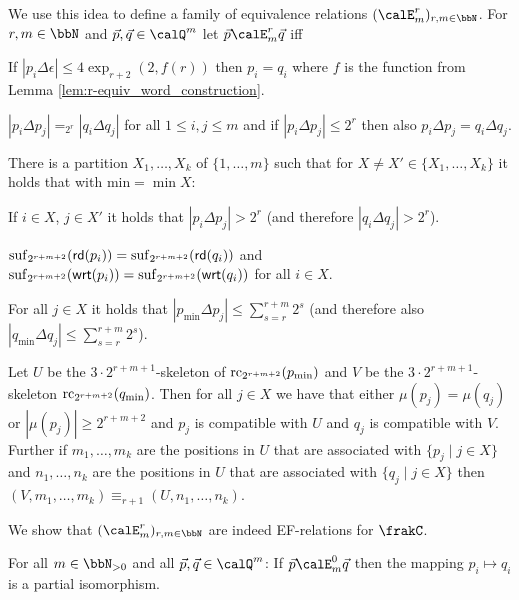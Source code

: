 We use this idea to  define a family of  equivalence relations $(\calE^r_m)_{r,m\in\bbN}$.
For $r,m\in \bbN$ and $\vec{p},\vec{q}\in \Qx^m$ let $\vec{p} \calE^r_m \vec{q}$ iff
\begin{bracketenumerate}
	\item If $|p_i \Delta \epsilon| \leq 4\exp_{r+2}(2, f(r))$ then $p_i=q_i$ where $f$ is the function from Lemma \ref{lem:r-equiv_word_construction}.
	\item\label{item:E_distance} $|p_i \Delta p_j| =_{2^r} |q_i\Delta q_j|$ for all $1\leq i, j\leq m$ and if $|p_i\Delta p_j| \leq 2^r$ then also $p_i \Delta p_j = q_i\Delta q_j$. 
	\item\label{item:E_partition} There is a partition $X_1,\ldots,X_k$ of $\{1,\ldots,m\}$ such that for $X\neq X'\in \{X_1,\ldots,X_k\}$ it holds that with $\text{min} = \min X$: 
	\begin{alphaenumerate}
		\item\label{item:part_distance} If $i\in X$, $j\in X'$ it holds that $|p_i\Delta p_j| > 2^r$ (and therefore $|q_i\Delta q_j| > 2^r$).
		\item\label{item:E_suffix} $\operatorname{suf}_{2^{r+m+2}}(\mathsf{rd}(p_i)) = \operatorname{suf}_{2^{r+m+2}}(\mathsf{rd}(q_i))$ and \\$\operatorname{suf}_{2^{r+m+2}}(\mathsf{wrt}(p_i)) = \operatorname{suf}_{2^{r+m+2}}(\mathsf{wrt}(q_i))$ for all $i\in X$.
		\item For all $j\in X$ it holds that $|p_\text{min} \Delta p_j| \leq \sum_{s= r}^{r+m} 2^s$ (and therefore also $|q_\text{min} \Delta q_j| \leq \sum_{s= r}^{r+m} 2^s$).
		\item\label{subitem:E_partition:equivalence} Let $U$ be the $3\cdot 2^{r+m+1}$-skeleton of $\operatorname{rc}_{2^{r+m+2}}(p_\text{min})$ and $V$ be the $3\cdot 2^{r+m+1}$-skeleton $\operatorname{rc}_{2^{r+m+2}}(q_\text{min})$. Then for all 
		$j\in X$ we have that either $\mu(p_j) = \mu(q_j)$ or $|\mu(p_j)| \geq 2^{r+m+2}$ and $p_j$ is compatible with $U$ and $q_j$ is compatible with $V$. Further if $m_1,\ldots, m_k$ are the positions in $U$ that are associated with $\{p_j \mid j\in X \}$ and $n_1,\ldots, n_k$ are the positions in $U$ that are associated with $\{q_j \mid j\in X \}$ then $(V,m_1,\ldots,m_k) \equiv_{r+1} (U,n_1,\ldots,n_k)$.
	\end{alphaenumerate}  
\end{bracketenumerate} 
We show that $(\calE^r_m)_{r,m\in\bbN}$ are indeed EF-relations for $\frakC$.
\begin{lemma}\label{lem:partial_isomorphism}
	For all $m\in\bbN_{>0}$ and all $\vec{p},\vec{q} \in \Qx^m$: If $\vec{p} \calE^0_m \vec{q}$ then the mapping $p_i \mapsto q_i$ is a partial isomorphism.
\end{lemma}
